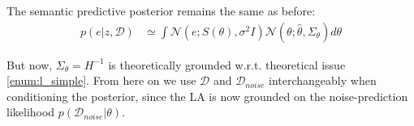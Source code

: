 The semantic predictive posterior remains the same as before:
\begin{align}
        p(e | z, \mathcal{D}) &\simeq \int \mathcal{N}\left(e; S(\theta), \sigma^2 I\right) \mathcal{N}\left(\theta; \hat{\theta}, \Sigma_\theta\right) d\theta \label{eq:semantic_post_pred}
\end{align}

But now, $\Sigma_\theta = H^{-1}$ is theoretically grounded w.r.t. theoretical issue \ref{enum:l_simple}. From here on we use $\mathcal{D}$ and $\mathcal{D}_{noise}$ interchangeably when conditioning the posterior, since the \acs{LA} is now grounded on the noise-prediction likelihood $p(\mathcal{D}_{noise}|\theta)$.





